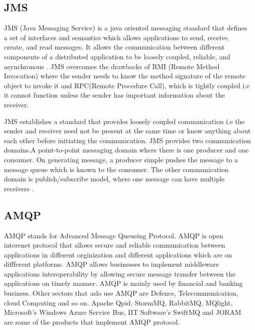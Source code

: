 \subsection{ JMS}

     JMS (Java Messaging Service) is a java oriented messaging
     standard that defines a set of interfaces and semantics which
     allows applications to send, receive, create, and read messages.
     It allows the communication between different components of a
     distributed application to be loosely coupled, reliable, and
     asynchronous \cite{www-jms-wiki}. JMS overcomes the drawbacks of
     RMI (Remote Method Invocation) where the sender needs to know the
     method signature of the remote object to invoke it and RPC(Remote
     Procedure Call), which is tightly coupled i.e it cannot function
     unless the sender has important information about the receiver.

     JMS establishes a standard that provides loosely coupled
     communication i.e the sender and receiver need not be present at
     the same time or know anything about each other before initiating
     the communication.  JMS provides two communication domains.A
     point-to-point messaging domain where there is one producer and
     one consumer. On generating message, a producer simple pushes the
     message to a message queue which is known to the consumer. The
     other communication domain is publish/subscribe model, where one
     message can have multiple receivers \cite{www-jms-oracle-docs}.

\subsection{ AMQP}

     \cite{www-amqp} AMQP stands for Advanced Message Queueing
     Protocol. AMQP is open interenet protocol that allows secure and
     reliable communication between applications in different
     orginization and different applications which are on diffferent
     platforms. AMQP allows businesses to implement middleware
     applications interoperability by allowing secure message transfer
     between the applications on timely manner. AMQP is mainly used by
     financial and banking business. Other sectors that aslo use AMQP
     are Defence, Telecommunication, cloud Computing and so on.
     Apache Qpid, StormMQ, RabbitMQ, MQlight, Microsoft's Windows
     Azure Service Bus, IIT Software's SwiftMQ and JORAM are some of
     the products that implement AMQP protocol.

